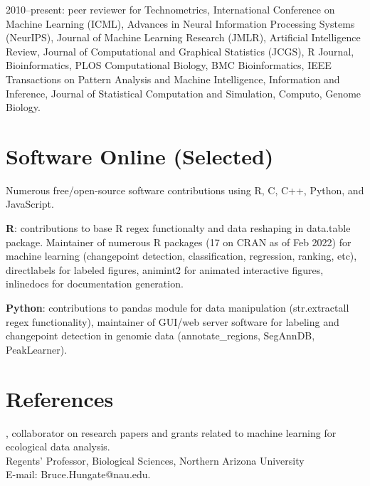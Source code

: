 \documentclass[margin,line]{res}
\begin{document}
\begin{resume}
2010--present: peer reviewer for Technometrics, International
Conference on Machine Learning (ICML), Advances in Neural Information
Processing Systems (NeurIPS), Journal of Machine Learning Research
(JMLR), Artificial Intelligence Review, Journal of Computational and
Graphical Statistics (JCGS), R Journal, Bioinformatics, PLOS
Computational Biology, BMC Bioinformatics, IEEE Transactions on
Pattern Analysis and Machine Intelligence, Information and Inference,
Journal of Statistical Computation and Simulation, Computo, Genome
Biology.

\section{\sc Software Online (Selected)} 

Numerous free/open-source software contributions using R, C, C++,
Python, and JavaScript.

{\bf R}: contributions to base R regex functionalty and data reshaping
in data.table package. Maintainer of numerous R packages (17 on CRAN
as of Feb 2022) for machine learning (changepoint detection,
classification, regression, ranking, etc), directlabels for labeled
figures, animint2 for animated interactive figures, inlinedocs for
documentation generation.

{\bf Python}: contributions to pandas module for data manipulation
(str.extractall regex functionality), maintainer of GUI/web server
software for labeling and changepoint detection in genomic data
(annotate\_regions, SegAnnDB, PeakLearner).



\section{\sc References}
 
, collaborator on research papers and grants related to machine learning for ecological data analysis. \\
Regents' Professor, Biological Sciences, Northern Arizona University\\
E-mail: Bruce.Hungate@nau.edu.


\end{resume}
\end{document}
